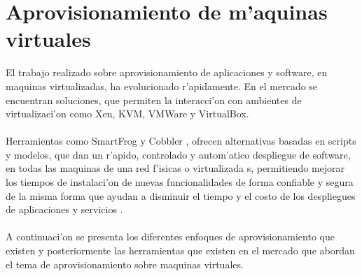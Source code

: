 \chapter{Aprovisionamiento de m'aquinas virtuales}
\label{aprmaqvir}
El trabajo realizado sobre aprovisionamiento de aplicaciones y software, en maquinas virtualizadas, ha evolucionado r'apidamente. En el mercado se encuentran soluciones, que permiten la interacci'on con ambientes de virtualizaci'on como Xen, KVM, VMWare y VirtualBox.\\
\\
Herramientas como SmartFrog \cite{3} y Cobbler \cite{6} , ofrecen alternativas basadas en scripts y modelos, que dan un r'apido, controlado y autom'atico despliegue de software, en todas las maquinas de una red f'isicas o virtualizada s, permitiendo mejorar los tiempos de instalaci'on de nuevas funcionalidades de forma confiable y segura de la misma forma que ayudan a disminuir el tiempo y el costo de los despliegues de aplicaciones y servicios \cite{4}.\\
\\
A continuaci'on se presenta los diferentes enfoques de aprovisionamiento que existen y posteriormente las herramientas que existen en el mercado que abordan el tema de aprovisionamiento sobre maquinas virtuales.


